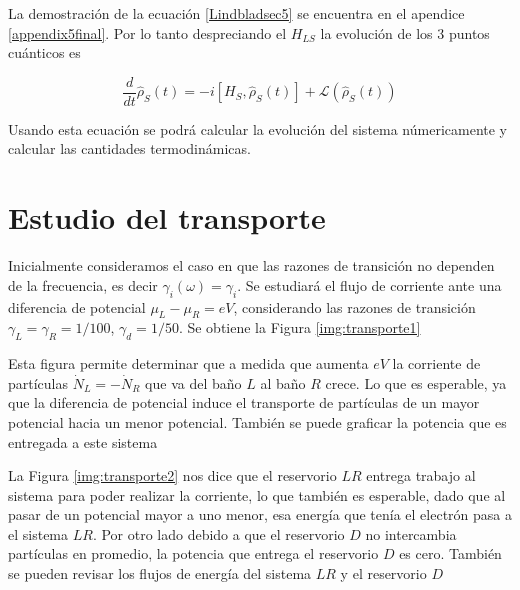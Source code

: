 La demostración de la ecuación \ref{Lindbladsec5} se encuentra en el apendice \ref{appendix5final}. Por lo tanto despreciando el $H_{LS}$ \cite{prech2023entanglement} la evolución de los 3 puntos cuánticos es

\begin{equation*}
    \frac{d}{dt}\hat{\rho}_{S}(t) = -i[H_{S},\hat{\rho}_{S}(t)] + \mathcal{L}(\hat{\rho}_{S}(t))
\end{equation*}

Usando esta ecuación se podrá calcular la evolución del sistema númericamente y calcular las cantidades termodinámicas.


\label{sec5:modelo}

\newpage

\section{Estudio del transporte}
Inicialmente consideramos el caso en que las razones de transición no dependen de la frecuencia, es decir $\gamma_{i}(\omega) = \gamma_{i}$. Se estudiará el flujo de corriente ante una diferencia de potencial $\mu_{L}-\mu_{R} = eV$, considerando las razones de transición $\gamma_{L}=\gamma_{R}=1/100$, $\gamma_{d}=1/50$. Se obtiene la Figura \ref{img:transporte1}


Esta figura permite determinar que a medida que aumenta $eV$ la corriente de partículas $\dot{N}_{L} = -\dot{N}_{R}$ que va del baño $L$ al baño $R$ crece. Lo que es esperable, ya que la diferencia de potencial induce el transporte de partículas de un mayor potencial hacia un menor potencial. También se puede graficar la potencia que es entregada a este sistema 

    
La Figura \ref{img:transporte2} nos dice que el reservorio $LR$ entrega trabajo al sistema para poder realizar la corriente, lo que también es esperable, dado que al pasar de un potencial mayor a uno menor, esa energía que tenía el electrón pasa a el sistema $LR$. Por otro lado debido a que el reservorio $D$ no intercambia partículas en promedio, la potencia que entrega el reservorio $D$ es cero. También se pueden revisar los flujos de energía del sistema $LR$ y el reservorio $D$


